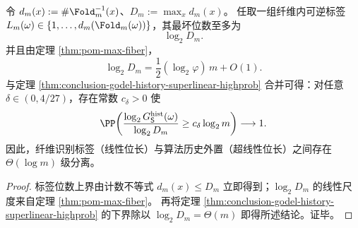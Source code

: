 \begin{proposition}[纤维标签与算法历史的量纲分离]\label{prop:conclusion-fiber-label-vs-history-separation}
令 \(d_m(x):=\#\Fold_m^{-1}(x)\)、\(D_m:=\max_x d_m(x)\)。
任取一组纤维内可逆标签 \(L_m(\omega)\in\{1,\dots,d_m(\Fold_m(\omega))\}\)，其最坏位数至多为
\[
\log_2 D_m.
\]
并且由定理 \ref{thm:pom-max-fiber}，
\[
\log_2 D_m=\frac12(\log_2\varphi)\,m+O(1).
\]
与定理 \ref{thm:conclusion-godel-history-superlinear-highprob} 合并可得：对任意 \(\delta\in(0,4/27)\)，存在常数 \(c_\delta>0\) 使
\[
\PP\!\left(
\frac{\log_2 G_{\mathsf S}^{\mathrm{hist}}(\omega)}{\log_2 D_m}
\ge c_\delta\log_2 m
\right)\longrightarrow 1.
\]
因此，纤维识别标签（线性位长）与算法历史外置（超线性位长）之间存在 \(\Theta(\log m)\) 级分离。
\end{proposition}
\begin{proof}
标签位数上界由计数不等式 \(d_m(x)\le D_m\) 立即得到；\(\log_2 D_m\) 的线性尺度来自定理 \ref{thm:pom-max-fiber}。
再将定理 \ref{thm:conclusion-godel-history-superlinear-highprob} 的下界除以 \(\log_2 D_m=\Theta(m)\) 即得所述结论。证毕。
\end{proof}



